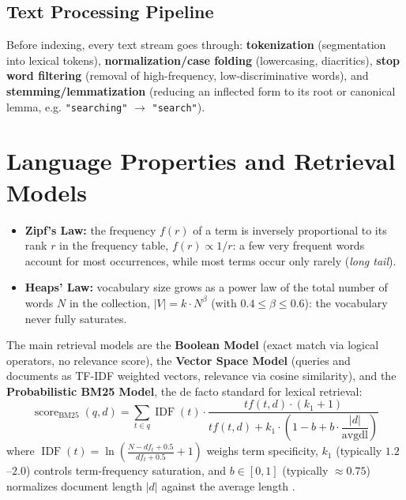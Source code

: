 \subsection{Text Processing Pipeline}
Before indexing, every text stream goes through: \textbf{tokenization} (segmentation into lexical tokens), \textbf{normalization/case folding} (lowercasing, diacritics), \textbf{stop word filtering} (removal of high-frequency, low-discriminative words), and \textbf{stemming/lemmatization} (reducing an inflected form to its root or canonical lemma, e.g. \texttt{"searching"} $\to$ \texttt{"search"}).

\FloatBarrier
\section{Language Properties and Retrieval Models}

\begin{itemize}
    \item \textbf{Zipf's Law:} the frequency $f(r)$ of a term is inversely proportional to its rank $r$ in the frequency table, $f(r) \propto 1/r$: a few very frequent words account for most occurrences, while most terms occur only rarely (\textit{long tail}).
    \item \textbf{Heaps' Law:} vocabulary size grows as a power law of the total number of words $N$ in the collection, $|V| = k \cdot N^\beta$ (with $0.4 \le \beta \le 0.6$): the vocabulary never fully saturates.
\end{itemize}

The main retrieval models are the \textbf{Boolean Model} (exact match via logical operators, no relevance score), the \textbf{Vector Space Model} (queries and documents as TF-IDF weighted vectors, relevance via cosine similarity), and the \textbf{Probabilistic BM25 Model}, the de facto standard for lexical retrieval:
\begin{equation}
\operatorname{score}_{\text{BM25}}(q, d) = \sum_{t \in q} \operatorname{IDF}(t) \cdot \frac{tf(t, d) \cdot (k_1 + 1)}{tf(t, d) + k_1 \cdot \left(1 - b + b \cdot \dfrac{|d|}{\text{avgdl}}\right)}
\label{eq:bm25-formula-en}
\end{equation}
where $\operatorname{IDF}(t) = \ln\!\left(\frac{N - df_t + 0.5}{df_t + 0.5} + 1\right)$ weighs term specificity, $k_1$ (typically $1.2$--$2.0$) controls term-frequency saturation, and $b \in [0,1]$ (typically $\approx 0.75$) normalizes document length $|d|$ against the average length .

